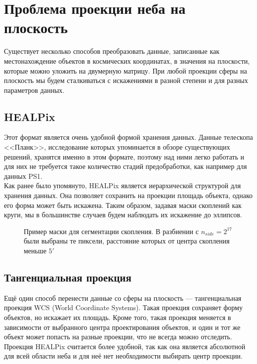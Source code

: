 \chapter{Проблема проекции неба на плоскость}
\label{cha:ch_4}

Существует несколько способов преобразовать данные, записанные как местонахождение объектов в космических
координатах, в значения на плоскости, которые можно уложить на двумерную матрицу. При любой проекции 
сферы на плоскость мы будем сталкиваться с искажениями в разной степени и для разных параметров данных.

\section{HEALPix}
Этот формат является очень удобной формой хранения данных. Данные телескопа <<Планк>>, исследование
которых упоминается в обзоре существующих решений, хранятся именно в этом формате, поэтому над ними 
легко работать и для них не требуется такое количество стадий предобработки, как например для данных 
PS1. \\

Как ранее было упомянуто, HEALPix является иерархической структурой для хранения данных. Она 
позволяет сохранить на проекции площадь объекта, однако его форма может быть искажена. Таким образом,
задавая маски скоплений как круги, мы в большинстве случаев будем наблюдать их искажение до эллипсов.\\

\begin{figure}
    \caption{Пример маски для сегментации скопления. В разбиении с $n_{side} = 2^{17}$ были выбраны
        те пиксели, расстояние которых от центра скопления меньше $5'$}
\end{figure}

\section{Тангенциальная проекция}
Ещё один способ перенести данные со сферы на плоскость --- тангенциальная проекция WCS (World 
Coordinate Systems). Такая проекция сохраняет форму объектов, но искажает их площадь. Кроме того, 
такая проекция меняется в зависимости от выбранного центра проектирования объектов, и один и тот же
объект может попасть на разные проекции, что не всегда можно отследить. \\

Проекция HEALPix считается более удобной, так как она является абсолютной для всей области неба и 
для неё нет необходимости выбирать центр проекции.\\
